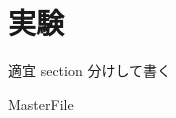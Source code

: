 \documentclass[a4j,twoside,12pt]{thesis} %
\begin{document}
\addtocounter{chapter}{+3}

\setlength{\baselineskip}{1.95zw}
\setlength{\textheight}{30\baselineskip}
\mainmatter

\fi
\renewcommand\thefootnote{\arabic{footnote})}


\chapter{実験}\label{exper}
適宜 section 分けして書く

\expandafter\ifx\csname MasterFile\endcsname\relax
\def\MasterFile{本原稿です}

% 



\end{document}
